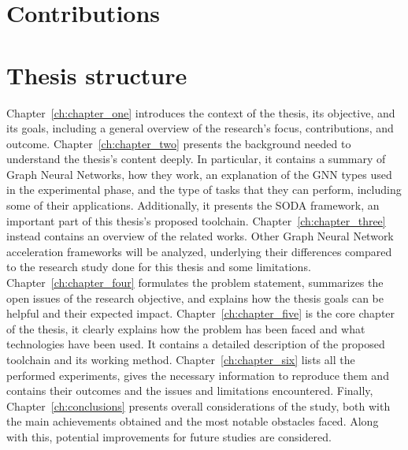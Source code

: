 \section{Contributions}
\label{sec:contributions}%


\section{Thesis structure}
\label{sec:thesis_structure}%

Chapter~\ref{ch:chapter_one} introduces the context of the thesis, its objective, and its goals, including a general overview of the research's focus, contributions, and outcome.
Chapter~\ref{ch:chapter_two} presents the background needed to understand the thesis's content deeply.
In particular, it contains a summary of Graph Neural Networks, how they work, an explanation of the GNN types used in the experimental phase, and the type of tasks that they can perform, including some of their applications.
Additionally, it presents the SODA framework, an important part of this thesis's proposed toolchain.
Chapter~\ref{ch:chapter_three} instead contains an overview of the related works.
Other Graph Neural Network acceleration frameworks will be analyzed, underlying their differences compared to the research study done for this thesis and some limitations.
Chapter~\ref{ch:chapter_four} formulates the problem statement, summarizes the open issues of the research objective, and explains how the thesis goals can be helpful and their expected impact.
Chapter~\ref{ch:chapter_five} is the core chapter of the thesis, it clearly explains how the problem has been faced and what technologies have been used.
It contains a detailed description of the proposed toolchain and its working method.
Chapter~\ref{ch:chapter_six} lists all the performed experiments, gives the necessary information to reproduce them and contains their outcomes and the issues and limitations encountered.
Finally, Chapter~\ref{ch:conclusions} presents overall considerations of the study, both with the main achievements obtained and the most notable obstacles faced.
Along with this, potential improvements for future studies are considered.